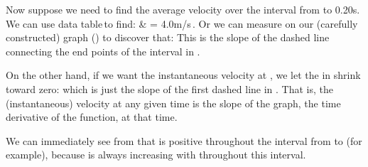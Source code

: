 {Now suppose we need to find the average velocity over the interval from
 to 0.20\unit{s}.
We can use data table\,to find:
%
          {       & = 4.0\unit{m/s}\,.}
%
Or we can measure on our (carefully constructed) graph () to discover
that:
%
%
This is the slope of the dashed line connecting the end points of the
interval in .

On the other hand, if we want the instantaneous velocity at , we
let the  in  shrink toward zero:
%
%
which is just the slope of the first dashed line in .
That is, the (instantaneous) velocity at any given time is the slope of the
graph, the time derivative of the function, at that time.

We can immediately see from  that  is positive throughout the
interval from  to  (for example), because  is always
increasing with  throughout this interval.

}%
%
